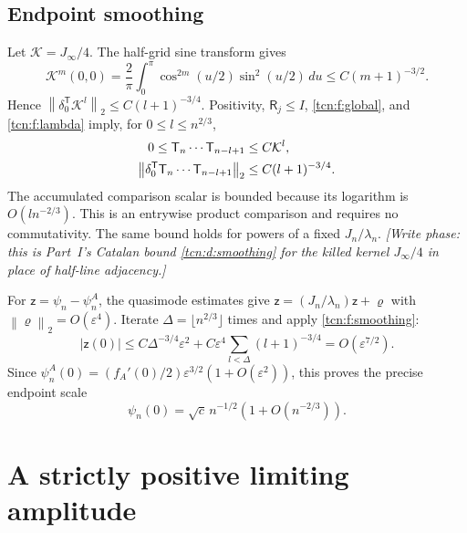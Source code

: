 \documentclass[11pt,letterpaper]{article}
\newcommand{\norm}[1]{\left\lVert#1\right\rVert}
\newcommand{\eps}{\varepsilon}
\theoremstyle{remark}
\begin{document}
\subsection{Endpoint smoothing}
Let $\mathcal K=J_\infty/4$. The half-grid sine transform gives
\begin{equation}\label{tcn:f:kernel}
 \mathcal K^m(0,0)=\frac2\pi\int_0^\pi\cos^{2m}(u/2)\sin^2(u/2)\,du
 \le C(m+1)^{-3/2}.
\end{equation}
Hence $\norm{\delta_0^{\mathsf T}\mathcal K^l}_2\le C(l+1)^{-3/4}$. Positivity, $\mathsf R_j\le I$, \eqref{tcn:f:global}, and \eqref{tcn:f:lambda} imply, for $0\le l\le n^{2/3}$,
\begin{align}
 0\le \mathsf T_n\cdots \mathsf T_{n-l+1}&\le C\mathcal K^l,\notag\\
 \norm{\delta_0^{\mathsf T}\mathsf T_n\cdots \mathsf T_{n-l+1}}_2&\le C(l+1)^{-3/4}.\label{tcn:f:smoothing}
\end{align}
The accumulated comparison scalar is bounded because its logarithm is $O(ln^{-2/3})$. This is an entrywise product comparison and requires no commutativity. The same bound holds for powers of a fixed $J_n/\lambda_n$. \emph{[Write phase: this is Part~I's Catalan bound \eqref{tcn:d:smoothing} for the killed kernel $J_\infty/4$ in place of half-line adjacency.]}

For $\mathsf z=\psi_n-\psi^A_n$, the quasimode estimates give $\mathsf z=(J_n/\lambda_n)\mathsf z+\varrho$ with $\norm\varrho_2=O(\eps^4)$. Iterate $\Delta=\lfloor n^{2/3}\rfloor$ times and apply \eqref{tcn:f:smoothing}:
\[
 |\mathsf z(0)|\le C\Delta^{-3/4}\eps^2+C\eps^4\sum_{l<\Delta}(l+1)^{-3/4}
 =O(\eps^{7/2}).
\]
Since $\psi^A_n(0)=(f_A'(0)/2)\eps^{3/2}(1+O(\eps^2))$, this proves the precise endpoint scale
\begin{equation}\label{tcn:f:perronendpoint}
 \psi_n(0)=\sqrt c\,n^{-1/2}\left(1+O(n^{-2/3})\right).
\end{equation}

\section{A strictly positive limiting amplitude}\label{tcn:f:sec:amplitude}
\end{document}
